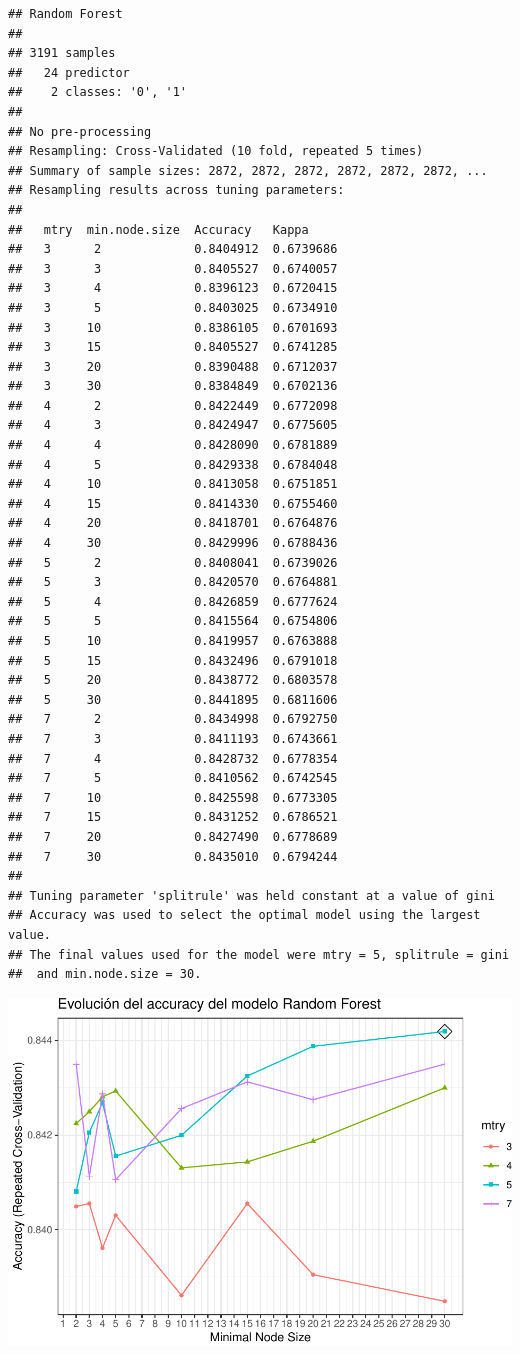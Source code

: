 \documentclass[]{article}
\begin{document}
\begin{lstlisting}
## Random Forest 
## 
## 3191 samples
##   24 predictor
##    2 classes: '0', '1' 
## 
## No pre-processing
## Resampling: Cross-Validated (10 fold, repeated 5 times) 
## Summary of sample sizes: 2872, 2872, 2872, 2872, 2872, 2872, ... 
## Resampling results across tuning parameters:
## 
##   mtry  min.node.size  Accuracy   Kappa    
##   3      2             0.8404912  0.6739686
##   3      3             0.8405527  0.6740057
##   3      4             0.8396123  0.6720415
##   3      5             0.8403025  0.6734910
##   3     10             0.8386105  0.6701693
##   3     15             0.8405527  0.6741285
##   3     20             0.8390488  0.6712037
##   3     30             0.8384849  0.6702136
##   4      2             0.8422449  0.6772098
##   4      3             0.8424947  0.6775605
##   4      4             0.8428090  0.6781889
##   4      5             0.8429338  0.6784048
##   4     10             0.8413058  0.6751851
##   4     15             0.8414330  0.6755460
##   4     20             0.8418701  0.6764876
##   4     30             0.8429996  0.6788436
##   5      2             0.8408041  0.6739026
##   5      3             0.8420570  0.6764881
##   5      4             0.8426859  0.6777624
##   5      5             0.8415564  0.6754806
##   5     10             0.8419957  0.6763888
##   5     15             0.8432496  0.6791018
##   5     20             0.8438772  0.6803578
##   5     30             0.8441895  0.6811606
##   7      2             0.8434998  0.6792750
##   7      3             0.8411193  0.6743661
##   7      4             0.8428732  0.6778354
##   7      5             0.8410562  0.6742545
##   7     10             0.8425598  0.6773305
##   7     15             0.8431252  0.6786521
##   7     20             0.8427490  0.6778689
##   7     30             0.8435010  0.6794244
## 
## Tuning parameter 'splitrule' was held constant at a value of gini
## Accuracy was used to select the optimal model using the largest value.
## The final values used for the model were mtry = 5, splitrule = gini
##  and min.node.size = 30.
\end{lstlisting}

\includegraphics{analisis_de_muchos_modelos_files/figure-latex/unnamed-chunk-24-1.pdf}
\end{document}
